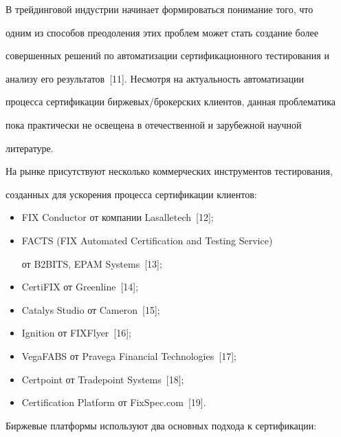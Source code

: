 В трейдинговой индустрии начинает формироваться понимание того, что


одним из способов преодоления этих проблем может стать создание более


совершенных решений по автоматизации сертификационного тестирования и


анализу его результатов~[11]. Несмотря на актуальность автоматизации


процесса сертификации биржевых/брокерских клиентов, данная проблематика


пока практически не освещена в отечественной и зарубежной научной


литературе.





На рынке присутствуют несколько коммерческих инструментов тестирования,


созданных для ускорения процесса сертификации клиентов:


\begin{itemize}


\item FIX Conductor от компании Lasalletech~[12];


\item FACTS (FIX Automated Certification and Testing Service)


от B2BITS, EPAM Systems~[13];


\item CertiFIX от Greenline~[14];


\item Catalys Studio от Cameron~[15];


\item Ignition от FIXFlyer~[16];


\item VegaFABS от Pravega Financial Technologies~[17];


\item Certpoint от Tradepoint Systems~[18];


\item Certification Platform от FixSpec.com~[19].


\end{itemize}





Биржевые платформы используют два основных подхода к сертификации:


